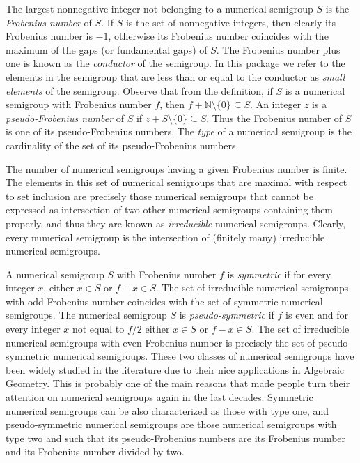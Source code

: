 \documentclass[a4paper,11pt]{report}
\begin{document}
{ The largest nonnegative integer not belonging to a numerical semigroup $S$ is the \emph{Frobenius number} of $S$. If $S$ is the set of nonnegative integers, then clearly its Frobenius number is $-1$, otherwise its Frobenius number coincides with the maximum of the gaps (or
fundamental gaps) of $S$. The Frobenius number plus one is known as the \emph{conductor} of the semigroup. In this package we refer to the elements in the semigroup
that are less than or equal to the conductor as \label{zlab1}\emph{small elements} of the semigroup. Observe that from the definition, if $S$ is a numerical semigroup with Frobenius number $f$, then $f+{\mathbb N}\setminus\{0\}\subseteq S$. An integer $z$ is a \label{lab2}\emph{pseudo-Frobenius number} of $S$ if $z+S\setminus\{0\}\subseteq S$. Thus the Frobenius number of $S$ is one of its pseudo-Frobenius numbers. The \emph{type} of a numerical semigroup is the cardinality of the set of its pseudo-Frobenius
numbers. 

 The number of numerical semigroups having a given Frobenius number is finite.
The elements in this set of numerical semigroups that are maximal with respect
to set inclusion are precisely those numerical semigroups that cannot be
expressed as intersection of two other numerical semigroups containing them
properly, and thus they are known as \emph{irreducible} numerical semigroups. Clearly, every numerical semigroup is the intersection
of (finitely many) irreducible numerical semigroups. 

 A numerical semigroup $S$ with Frobenius number $f$ is \emph{symmetric} if for every integer $x$, either $x\in S$ or $f-x\in S$. The set of irreducible numerical semigroups with odd Frobenius number
coincides with the set of symmetric numerical semigroups. The numerical
semigroup $S$ is \emph{pseudo-symmetric} if $f$ is even and for every integer $x$ not equal to $f/2$ either $x\in S$ or $f-x\in S$. The set of irreducible numerical semigroups with even Frobenius number is
precisely the set of pseudo-symmetric numerical semigroups. These two classes
of numerical semigroups have been widely studied in the literature due to
their nice applications in Algebraic Geometry. This is probably one of the
main reasons that made people turn their attention on numerical semigroups
again in the last decades. Symmetric numerical semigroups can be also
characterized as those with type one, and pseudo-symmetric numerical
semigroups are those numerical semigroups with type two and such that its
pseudo-Frobenius numbers are its Frobenius number and its Frobenius number
divided by two. 

}
\end{document}
